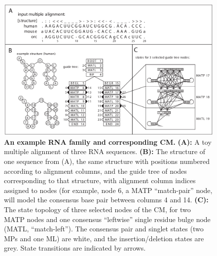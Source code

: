 \begin{figure}
\begin{center}
\includegraphics[width=6.4in]{figs/d4fig_0}
\caption{\textbf{An example RNA family and corresponding CM.}
  \textbf{(A):} A toy multiple alignment of three RNA
  sequences. \textbf{(B):} The structure of one sequence from (A), the
  same structure with positions numbered according to alignment
  columns, and the guide tree of nodes corresponding to that
  structure, with alignment column indices assigned to nodes (for
  example, node 6, a MATP ``match-pair'' node, will model the
  consensus base pair between columns 4 and 14. \textbf{(C):} The
  state topology of three selected nodes of the CM, for two MATP nodes
  and one consensus ``leftwise'' single residue bulge node (MATL,
  ``match-left'').  The consensus pair and singlet states (two MPs and
  one ML) are white, and the insertion/deletion states are grey. State
  transitions are indicated by arrows.}
\label{fig:cmintro}
\end{center}
\end{figure}
